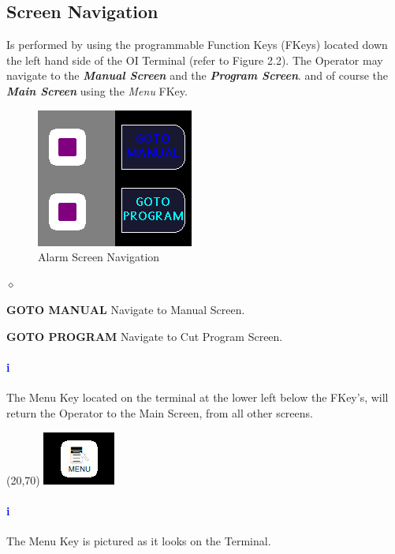 \subsection{Screen Navigation}Is performed by using the programmable Function Keys (FKeys) located down the left hand side of the OI Terminal (refer to Figure 2.2). The Operator may navigate to the \textbf{\textit{Manual Screen}} and the \textbf{\textit{Program Screen}}. and of course the \textbf{\textit{Main Screen}} using the \textit{Menu} FKey.
\begin{figure}
	\centering
	\includegraphics[width=.3\linewidth]{screen-captures/alarms-nav}
	\caption{Alarm Screen Navigation}
	\label{fig:alarm-nav}
\end{figure}
\begin{list}{$\diamond$}{}
	\item \textbf{GOTO MANUAL} Navigate to Manual Screen.
	\item \textbf{GOTO PROGRAM} Navigate to Cut Program Screen.
\end{list}

\paragraph*{\textbf{\LARGE \textcolor{blue}{i}}}
The Menu Key located on the terminal at the lower left below the FKey's, will return the Operator to the Main Screen, from all other screens.\\
\begin{minipage}{4cm}
	\begin{picture}(20,70)
	\includegraphics[width=.5\linewidth]{screen-captures/menu}
	\end{picture}
\end{minipage}\begin{minipage}[]{11cm}
\paragraph{\textbf{\LARGE \textcolor{blue}{i}}} The Menu Key is pictured as it looks on the Terminal.
\end{minipage}
\pagebreak

